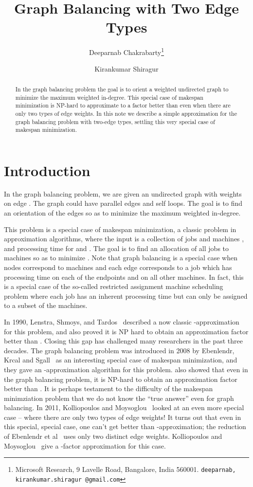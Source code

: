 \documentclass[11pt]{article}
\newcommand*\samethanks[1][\value{footnote}]{\footnotemark[#1]}
\begin{document}
\title{Graph Balancing with Two Edge Types }
\author{Deeparnab Chakrabarty\thanks{Microsoft Research, 9 Lavelle Road, Bangalore, India 560001. {\tt deeparnab, kirankumar.shiragur @gmail.com}} \and Kirankumar Shiragur\samethanks}\date{}
\maketitle
\begin{abstract}
	In the graph balancing problem the goal is to orient a weighted undirected graph to minimize the maximum weighted in-degree. This special case of makespan minimization is NP-hard to approximate to a factor better than  even when there are only two types of edge weights. In this note we describe a simple  approximation for the graph balancing problem with two-edge types, settling this very special case of makespan minimization.
\end{abstract}
\section{Introduction}
In the graph balancing problem, we are given an undirected graph  with weights  on edge . The graph could have parallel edges and self loops. The goal is to find an orientation of the edges so as to minimize the maximum weighted in-degree. 

This problem is a special case of makespan minimization, a classic problem in approximation algorithms, where
the input is a collection of jobs  and machines , and processing time  for  and .
The goal is to find an allocation of all jobs to machines so as to minimize . Note that graph balancing is a special case 
when nodes correspond to machines and each edge corresponds to a job which has processing time  on each of the endpoints and  on all other machines. In fact, this is a special case of the so-called restricted assignment machine scheduling problem where each job has an inherent processing time but can only be assigned to a subset of the machines.

In 1990, Lenstra, Shmoys, and Tardos~\cite{LST} described a now classic -approximation for this problem, and also proved it is NP hard to obtain an approximation factor better than . Closing this gap has challenged many researchers in the past three decades. The graph balancing problem was introduced in 2008 by  Ebenlendr, Krcal and Sgall~\cite{EKS} as an interesting special case of makespan minimization, and they gave an -approximation algorithm for this problem. \cite{EKS} also showed that even in the graph balancing problem, it is NP-hard to obtain an approximation factor better than . 
It is perhaps testament to the difficulty of the makespan minimziation problem that we do not know the ``true answer'' even for graph balancing. In 2011, Kolliopoulos and Moysoglou~\cite{KM} looked at an even more special case -- where there are only two types of edge weights! It turns out that even in this special, special case, one can't get better than -approximation; the reduction of Ebenlendr et al~\cite{EKS} uses only two distinct edge weights. Kolliopoulos and Moysoglou~\cite{KM} give a -factor approximation for this case. 
\end{document}
